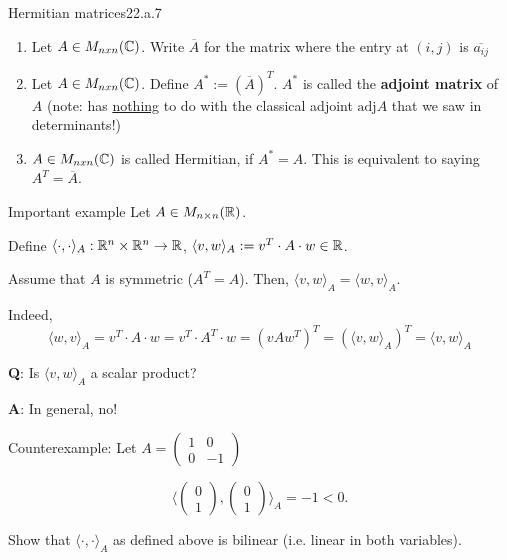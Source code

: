 \documentclass[12pt]{article}
\begin{document}
\begin{definition}{Hermitian matrices}{22.a.7}
    \begin{enumerate}
        \item Let $A \in M_{nxn}(\mathbb{C})$. Write $\overline{A}$ for the matrix where the entry at $(i, j)$ is $\overline{a_{ij}}$
        \item Let $A \in M_{nxn}(\mathbb{C})$. Define $A^* := (\overline{A})^T$. $A^*$ is called the \textbf{adjoint matrix} of $A$ (note: has \underline{nothing} to do with the classical adjoint $\mathrm{adj}A$ that we saw in determinants!)
        \item $A \in M_{nxn}(\mathbb{C})$ is called Hermitian, if $A^* = A$. This is equivalent to saying $A^T = \overline{A}$.
    \end{enumerate}
\end{definition}

\begin{example}{Important example}{}
    Let $A \in M_{n\times n}(\mathbb{R})$.

    Define $\langle \cdot, \cdot \rangle_A : \mathbb{R}^n \times \mathbb{R}^n \rightarrow \mathbb{R}$, $\langle v, w \rangle_A := v^T\cdot A \cdot w \in \mathbb{R}$.

    Assume that $A$ is symmetric ($A^T = A$). Then, $\langle v, w \rangle_A = \langle w, v \rangle_A$. 
    
    Indeed, 
    $$
    \langle w, v \rangle_A = v^T\cdot A \cdot w = v^T\cdot A^T \cdot w = (v A w^T)^T = (\langle v, w \rangle_A)^T = \langle v, w \rangle_A
    $$

    \textbf{Q}: Is $\langle v, w \rangle_A$ a scalar product?

    \textbf{A}: In general, no!

    Counterexample: Let $A = \begin{pmatrix}
        1 & 0 \\
        0 & -1
    \end{pmatrix}$

    $$
    \langle \begin{pmatrix} 0 \\ 1 \end{pmatrix}, \begin{pmatrix} 0 \\ 1 \end{pmatrix} \rangle_A = -1 < 0.
    $$
\end{example}

\begin{exercise}{}{}
    Show that $\langle \cdot, \cdot \rangle_A$ as defined above is bilinear (i.e. linear in both variables).
\end{exercise}
\end{document}
